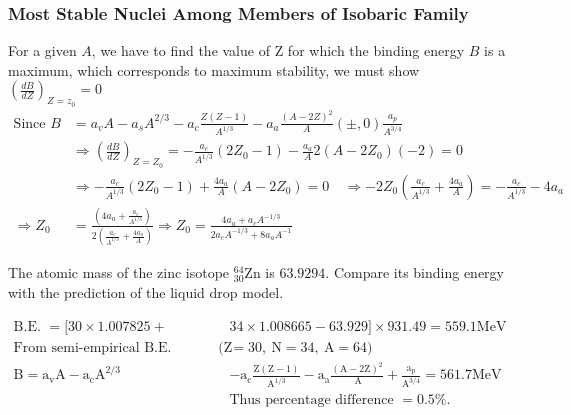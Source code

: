 \subsubsection{Most Stable Nuclei Among Members of Isobaric Family}
For a given $A$, we have to find the value of $\mathrm{Z}$ for which the binding energy $B$ is a maximum, which corresponds to maximum stability, we must show $\left(\frac{d B}{d Z}\right)_{Z=z_0}=0$
\begin{align*}
\text{Since }B&=a_v A-a_s A^{2 / 3}-a_c \frac{Z(Z-1)}{A^{1 / 3}}-a_a \frac{(A-2 Z)^2}{A}(\pm, 0) \frac{a_p}{A^{3 / 4}}\\
&\Rightarrow\left(\frac{d B}{d Z}\right)_{Z=Z_0}=-\frac{a_c}{A^{1 / 3}}\left(2 Z_0-1\right)-\frac{a_a}{A} 2\left(A-2 Z_0\right)(-2)=0 \\
&\Rightarrow-\frac{a_c}{A^{1 / 3}}\left(2 Z_0-1\right)+\frac{4 a_a}{A}\left(A-2 Z_0\right)=0 \quad \Rightarrow-2 Z_0\left(\frac{a_c}{A^{1 / 3}}+\frac{4 a_a}{A}\right)=-\frac{a_c}{A^{1 / 3}}-4 a_a \\
\Rightarrow Z_0&=\frac{\left(4 a_a+\frac{a_c}{A^{1 / 3}}\right)}{2\left(\frac{a_c}{A^{1 / 3}}+\frac{4 a_a}{A}\right)} \Rightarrow Z_0=\frac{4 a_a+a_c A^{-1 / 3}}{2 a_c A^{-1 / 3}+8 a_a A^{-1}}
\end{align*}
\begin{exercise}
	The atomic mass of the zinc isotope ${ }_{30}^{64} \mathrm{Zn}$ is $63.9294$. Compare its binding energy with the prediction of the liquid drop model.
\end{exercise}
\begin{answer}
	\begin{align*}
	\text{B.E. }=[30 \times 1.007825+&34 \times 1.008665-63.929] \times 931.49=559.1 \mathrm{MeV}\\
	\text{From semi-empirical B.E. formula }(\mathrm{Z}&=30, \mathrm{~N}=34, \mathrm{~A}=64)\\
	\mathrm{B}=\mathrm{a}_{\mathrm{v}} \mathrm{A}-\mathrm{a}_{\mathrm{c}} \mathrm{A}^{2 / 3}&-\mathrm{a}_{\mathrm{c}} \frac{\mathrm{Z}(\mathrm{Z}-1)}{\mathrm{A}^{1 / 3}}-\mathrm{a}_{\mathrm{a}} \frac{(\mathrm{A}-2 \mathrm{Z})^2}{\mathrm{~A}}+\frac{\mathrm{a}_{\mathrm{p}}}{\mathrm{A}^{3 / 4}}=561.7 \mathrm{MeV}\\
	&\text{Thus percentage difference $=0.5 \%$.}
	\end{align*}
\end{answer}
